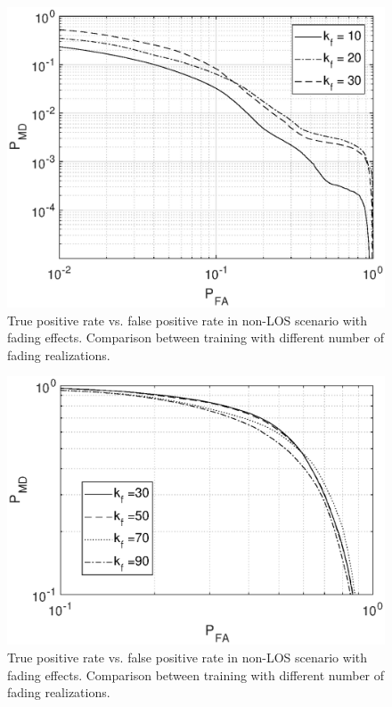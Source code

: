 \documentclass[draftcls,onecolumn,12pt]{IEEEtran}
\begin{document}
\begin{figure}
    \centering
    \includegraphics[width=0.5\columnwidth]{res_avg_nFading_SVM.eps}
    \caption{True positive rate vs. false positive rate in non-LOS scenario with fading effects. Comparison between training with different number of fading realizations.}
    \label{fig:faded}
\end{figure}


\begin{figure}
    \centering
    \includegraphics[width=0.5\columnwidth]{res_avg_nFading_oneClass.eps}
    \caption{True positive rate vs. false positive rate in non-LOS scenario with fading effects. Comparison between training with different number of fading realizations.}
    \label{fig:faded}
\end{figure}
\newpage 



%
%
\renewcommand*{\bibfont}{\footnotesize}

\printbibliography
\end{document}
